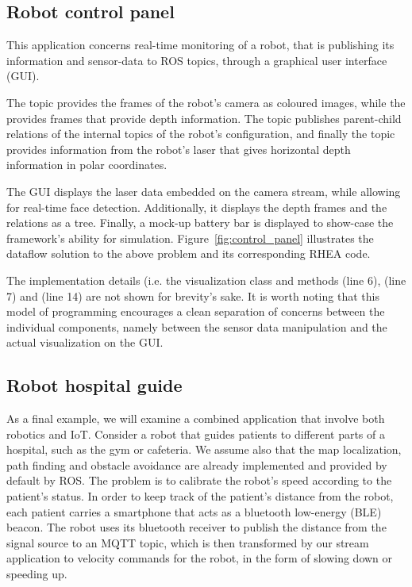 \documentclass[sigplan,screen,10pt]{acmart}
\begin{document}
\subsection{Robot control panel}

This application concerns real-time monitoring of a robot, that is publishing
its information and sensor-data to ROS topics, through a
graphical user interface (GUI).

The  topic provides the frames of the robot's camera as
coloured images, while the  provides frames that provide
depth information. The  topic publishes parent-child relations of
the internal topics of the robot's configuration, and finally the
 topic provides information from the robot's laser that gives
horizontal depth information in polar coordinates.

The GUI displays the laser data embedded on the camera stream, while allowing
for real-time face detection. Additionally, it displays the depth frames and the
 relations as a tree. Finally, a mock-up battery bar is displayed to
show-case the framework's ability for simulation. Figure~\ref{fig:control_panel}
illustrates the dataflow solution to the above problem and its corresponding
\textsc{RHEA} code.
%

The implementation details (i.e. the visualization class and methods
 (line 6),  (line 7) and
 (line 14) are not shown for brevity's sake. It is worth noting
that this model of programming encourages a clean separation of concerns between the
individual components, namely between the sensor data manipulation and the
actual visualization on the GUI.

\subsection{Robot hospital guide}

As a final example, we will examine a combined application that involve both robotics and IoT.
Consider a robot that guides patients to different parts of a hospital, such as the gym or
cafeteria. We assume also that the map localization, path finding and obstacle
avoidance are already implemented and provided by default by ROS. The problem
is to calibrate the robot's speed according to the patient's status.
%
In order to keep track of the patient's distance from the robot, each patient carries a
smartphone that acts as a bluetooth low-energy (BLE) beacon. The robot uses its
bluetooth receiver to publish the distance from the signal source to an
MQTT topic, which is then transformed by our stream application to velocity
commands for the robot, in the form of slowing down or speeding up.
\end{document}
